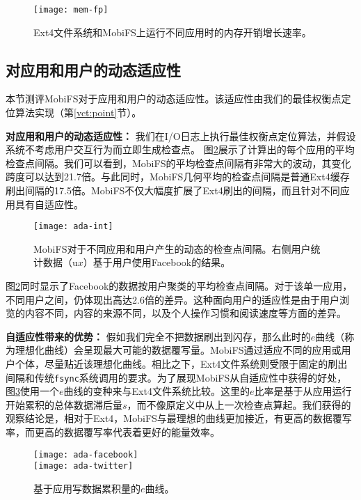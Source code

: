 \begin{figure}[!ht]
  \centering
  \texttt{[image: mem-fp]}
  \caption{Ext4文件系统和MobiFS上运行不同应用时的内存开销增长速率。}
  \label{fig:mem-fp}
\end{figure}

\subsection{对应用和用户的动态适应性} \label{vct:eval-ada}

本节测评MobiFS对于应用和用户的动态适应性。该适应性由我们的最佳权衡点定位算法实现（第\ref{vct:point}节）。

\noindent\textbf{对应用和用户的动态适应性：}
我们在I/O日志上执行最佳权衡点定位算法，并假设系统不考虑用户交互行为而立即生成检查点。
图\ref{fig:ada-int}展示了计算出的每个应用的平均检查点间隔。我们可以看到，MobiFS的平均检查点间隔有非常大的波动，其变化跨度可以达到21.7倍。与此同时，MobiFS几何平均的检查点间隔是普通Ext4缓存刷出间隔的17.5倍。MobiFS不仅大幅度扩展了Ext4刷出的间隔，而且针对不同应用具有自适应性。

\begin{figure}[!ht]
  \centering
  \texttt{[image: ada-int]}
  \caption{MobiFS对于不同应用和用户产生的动态的检查点间隔。右侧用户统计数据（u$x$）基于用户使用Facebook的结果。}
  \label{fig:ada-int}
\end{figure}

图\ref{fig:ada-int}同时显示了Facebook的数据按用户聚类的平均检查点间隔。对于该单一应用，不同用户之间，仍体现出高达2.6倍的差异。这种面向用户的适应性是由于用户浏览的内容不同，内容的来源不同，以及个人操作习惯和阅读速度等方面的差异。

\noindent\textbf{自适应性带来的优势：}
假如我们完全不把数据刷出到闪存，那么此时的$e$曲线（称为理想化曲线）会呈现最大可能的数据覆写量。MobiFS通过适应不同的应用或用户个体，尽量贴近该理想化曲线。相比之下，Ext4文件系统则受限于固定的刷出间隔和传统\texttt{fsync}系统调用的要求。为了展现MobiFS从自适应性中获得的好处，图\ref{fig:spa-ada}使用一个$e$曲线的变种来与Ext4文件系统比较。这里的$e$比率是基于从应用运行开始累积的总体数据滞后量$s$，而不像原定义中从上一次检查点算起。我们获得的观察结论是，相对于Ext4，MobiFS与最理想的曲线更加接近，有更高的数据覆写率，而更高的数据覆写率代表着更好的能量效率。

\begin{figure}[!ht]
\centering
\texttt{[image: ada-facebook]}\\
\vspace{10pt}
\texttt{[image: ada-twitter]}\\
\caption{基于应用写数据累积量的$e$曲线。}
\label{fig:spa-ada}
\end{figure}

